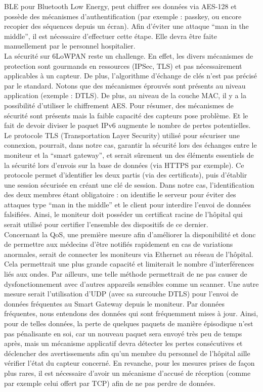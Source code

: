 \documentclass{article}
\begin{document}
BLE pour Bluetooth Low Energy, peut chiffrer ses données via AES-128 et possède des mécanismes d’authentification (par exemple : passkey, ou encore recopier des séquences depuis un écran). Afin d’éviter une attaque “man in the middle”, il est nécessaire d’effectuer cette étape. Elle devra être faite manuellement par le personnel hospitalier.  
\\

La sécurité sur 6LoWPAN \cite{hennebert2014security} reste un challenge. En effet, les divers mécanismes de protection sont gourmands en ressources (IPSec, TLS) et pas nécessairement applicables à un capteur. De plus, l’algorithme d’échange de clés n’est pas précisé par le standard. Notons que des mécanismes éprouvés sont présents au niveau application (exemple : DTLS). De plus, au niveau de la couche MAC, il y a la possibilité d’utiliser le chiffrement AES. Pour résumer, des mécanismes de sécurité sont présents mais la faible capacité des capteurs pose problème. Et le fait de devoir diviser le paquet IPv6 augmente le nombre de pertes potentielles.
\\

Le protocole TLS (Transportation Layer Security) utilisé pour sécuriser une connexion, pourrait, dans notre cas, garantir la sécurité lors des échanges entre le moniteur et la “smart gateway”, et serait sûrement un des éléments essentiels de la sécurité lors d’envois sur la base de données (via HTTPS par exemple). Ce protocole permet d’identifier les deux partis (via des certificats), puis d’établir une session sécurisée en créant une clé de session. Dans notre cas, l’identification des deux membres étant obligatoire : on identifie le serveur pour éviter des attaques type “man in the middle” et le client pour interdire l’envoi de données falsifiées. Ainsi, le moniteur doit posséder un certificat racine de l’hôpital qui serait utilisé pour certifier l’ensemble des dispositifs de ce dernier.
\\

Concernant la QoS, une première mesure afin d’améliorer la disponibilité et donc de permettre aux médecins d’être notifiés rapidement en cas de variations anormales, serait de connecter les moniteurs via Ethernet au réseau de l’hôpital. Cela permettrait une plus grande capacité et limiterait le nombre d’interférences liés aux ondes. Par ailleurs, une telle méthode permettrait de ne pas causer de dysfonctionnement avec d’autres appareils sensibles comme un scanner. Une autre mesure serait l’utilisation d’UDP (avec sa surcouche DTLS) pour l’envoi de données fréquentes au Smart Gateway depuis le moniteur. Par données fréquentes, nous entendons des données qui sont fréquemment mises à jour. Ainsi, pour de telles données, la perte de quelques paquets de manière épisodique n’est pas pénalisante en soi, car un nouveau paquet sera envoyé très peu de temps après, mais un mécanisme applicatif devra détecter les pertes consécutives et déclencher des avertissements afin qu'un membre du personnel de l'hôpital aille vérifier l'état du capteur concerné. En revanche, pour les mesures prises de façon plus rares, il est nécessaire d’avoir un mécanisme d’accusé de réception (comme par exemple celui offert par TCP) afin de ne pas perdre de données.
\end{document}
